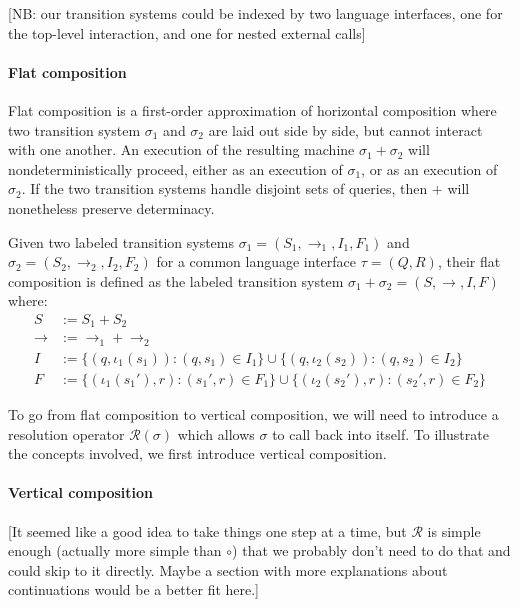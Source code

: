 \documentclass[sigplan,10pt,review,anonymous]{acmart}
\begin{document}
[NB: our transition systems could be indexed by two language interfaces,
one for the top-level interaction, and one for nested external calls]

\paragraph{Flat composition} %

Flat composition
is a first-order approximation of horizontal composition
where two transition system $\sigma_1$ and $\sigma_2$
are laid out side by side,
but cannot interact with one another.
An execution of the resulting machine $\sigma_1 + \sigma_2$
will nondeterministically proceed,
either as an execution of $\sigma_1$,
or as an execution of $\sigma_2$.
If the two transition systems
handle disjoint sets of queries,
then $+$ will nonetheless preserve determinacy.

\begin{definition}
Given two labeled transition systems
$\sigma_1 = (S_1, \rightarrow_1, I_1, F_1)$ and
$\sigma_2 = (S_2, \rightarrow_2, I_2, F_2)$
for a common language interface $\tau = (Q, R)$,
their flat composition is defined as
the labeled transition system
$\sigma_1 + \sigma_2 = (S, \rightarrow, I, F)$
where:
\begin{align*}
  S &:= S_1 + S_2 \\
  {\rightarrow} &:= {\rightarrow_1} + {\rightarrow_2} \\
  I &:= \{ (q, \iota_1(s_1)) : (q, s_1) \in I_1 \}
   \cup \{ (q, \iota_2(s_2)) : (q, s_2) \in I_2 \} \\
  F &:= \{ (\iota_1(s_1'), r) : (s_1', r) \in F_1 \}
   \cup \{ (\iota_2(s_2'), r) : (s_2', r) \in F_2 \}
\end{align*}
\end{definition}

To go from flat composition to vertical composition,
we will need to introduce a resolution operator $\mathcal{R}(\sigma)$
which allows $\sigma$ to call back into itself.
To illustrate the concepts involved,
we first introduce vertical composition.


\paragraph{Vertical composition} %

[It seemed like a good idea to take things one step at a time,
but $\mathcal{R}$ is simple enough (actually more simple than $\circ$)
that we probably don't need to do that and could skip to it directly.
Maybe a section with more explanations about continuations would
be a better fit here.]
\end{document}
